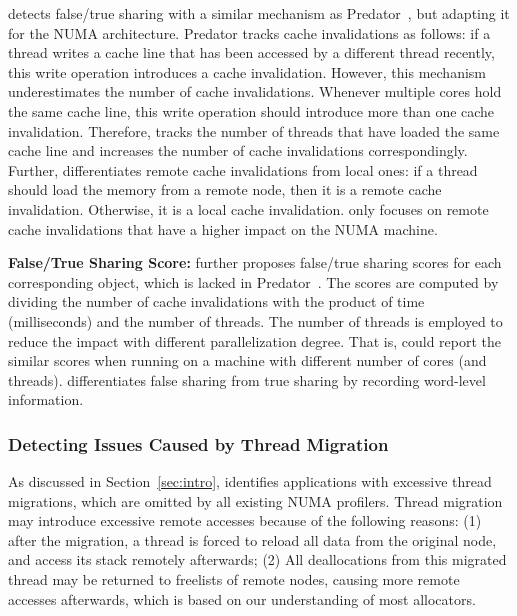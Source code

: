 \NP{} detects false/true sharing with a similar mechanism as Predator~\cite{Predator}, but adapting it for the NUMA architecture. Predator tracks cache invalidations as follows: if a thread writes a cache line that has been accessed by a different thread recently, this write operation introduces a cache invalidation. However, this mechanism underestimates the number of cache invalidations. Whenever multiple cores hold the same cache line, this  write operation should introduce more than one cache invalidation. 
Therefore, \NP{} tracks the number of threads that have loaded the same cache line and increases the number of cache invalidations correspondingly. Further, \NP{} differentiates remote cache invalidations from local ones: if a thread should load the memory from a remote node, then it is a remote cache invalidation. Otherwise, it is a local cache invalidation. \NP{} only focuses on remote cache invalidations that have a higher impact on the NUMA machine.  


\textbf{False/True Sharing Score:} 
\NP{} further proposes false/true sharing scores for each corresponding object, which is lacked in Predator~\cite{Predator}. The scores are computed by dividing the number of cache invalidations with the product of time (milliseconds) and the number of threads. The number of threads is employed to reduce the impact with different parallelization degree. That is, \NP{} could report the similar scores when running on a machine with different number of cores (and threads).
\NP{}  differentiates false sharing from true sharing by recording word-level information.

\subsubsection{Detecting Issues Caused by Thread Migration}

As discussed in Section~\ref{sec:intro}, \NP{} identifies applications with excessive thread migrations, which are omitted by all existing NUMA profilers. Thread migration may introduce excessive remote accesses because of the following reasons: (1) after the migration, a thread is forced to reload all data from the original node, and access its stack remotely afterwards; (2) All deallocations from this migrated thread may be returned to freelists of remote nodes, causing more remote accesses afterwards, which is based on our understanding of most allocators.    


